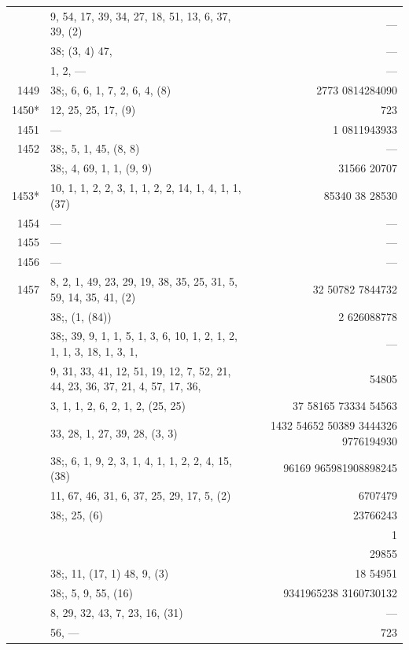 \documentclass[11pt]{article}
\begin{document}
{\begin{longtable}{|r|p{8.5cm}|r|}
       & 9, 54, 17, 39, 34, 27, 18, 51, 13, 6, 37, 39, (2) & --- \\
       & $38$;\; (3, 4) 47, & --- \\
       & 1, 2, --- & --- \\
\hline
1449   & $38$;\; 1, 6, 6, 1, 7, 2, 6, 4, (8) & 2773 0814284090 \\
1450*  & 12, 25, 25, 17, (9) & 723 \\
1451   & --- & 1 0811943933 \\
1452   & $38$;\; 10, 5, 1, 45, (8, 8) & --- \\
       & $38$;\; 8, 4, 69, 1, 1, (9, 9) & 31566 20707 \\
1453*  & 10, 1, 1, 2, 2, 3, 1, 1, 2, 2, 14, 1, 4, 1, 1, (37) & 85340 38 28530 \\
1454   & --- & --- \\
1455   & --- & --- \\
1456   & --- & --- \\
1457   & 8, 2, 1, 49, 23, 29, 19, 38, 35, 25, 31, 5, 59, 14, 35, 41, (2) & 32 50782 7844732 \\
\hline
       & $38$;\; 7, (1, (84)) & 2 626088778 \\
\hline
       & $38$;\; 37, 39, 9, 1, 1, 5, 1, 3, 6, 10, 1, 2, 1, 2, 1, 1, 3, 18, 1, 3, 1, & --- \\
       & 9, 31, 33, 41, 12, 51, 19, 12, 7, 52, 21, 44, 23, 36, 37, 21, 4, 57, 17, 36, & 54805 \\
       & 3, 1, 1, 2, 6, 2, 1, 2, (25, 25) & 37 58165 73334 54563 \\
       & 33, 28, 1, 27, 39, 28, (3, 3) & 1432 54652 50389 3444326 9776194930 \\
       & $38$;\; 10, 6, 1, 9, 2, 3, 1, 4, 1, 1, 2, 2, 4, 15, (38) & 96169 965981908898245 \\
       & 11, 67, 46, 31, 6, 37, 25, 29, 17, 5, (2) & 6707479 \\
       & $38$;\; 1, 25, (6) & 23766243 \\
       & & 1 \\
       & & 29855 \\
       & $38$;\; 12, 11, (17, 1) 48, 9, (3) & 18 54951 \\
       & $38$;\; 13, 5, 9, 55, (16) & 9341965238 3160730132 \\
       & 8, 29, 32, 43, 7, 23, 16, (31) & --- \\
       & 56, --- & 723 \\
\hline
\end{longtable}
}
\end{document}
